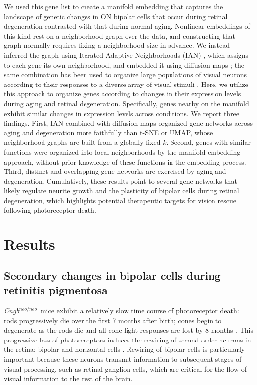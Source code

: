 \documentclass[11pt, a4paper]{article}
\newcommand{\cngb}{\textit{Cngb$^{neo/neo}$}~}
\begin{document}
 We used this gene list to create a manifold embedding that captures the landscape of genetic changes in ON bipolar cells that occur during retinal degeneration contrasted with that during normal aging. Nonlinear embeddings of this kind rest on a neighborhood graph over the data, and constructing that graph normally requires fixing a neighborhood size in advance. We instead inferred the graph using
Iterated Adaptive Neighborhoods (IAN) \citep{Dyballa2023-ur}, which assigns to each gene its own neighborhood, and embedded it using diffusion maps \citep{Coifman2005-te}; the same combination has been used to organize large populations of visual neurons according to their responses to a diverse array of visual stimuli \citep{Dyballa2024-sa}. Here, we utilize this approach to organize genes according to changes in their expression levels during aging and retinal degeneration. Specifically, genes nearby on the manifold exhibit similar changes in expression levels across conditions. We report three findings. First, IAN combined with diffusion maps organized gene networks across aging and degeneration more faithfully than t-SNE or UMAP, whose neighborhood graphs are built from a globally fixed $k$. Second, genes with similar functions were organized into local neighborhoods by the manifold embedding approach, without prior knowledge of these functions in the embedding process. Third, distinct and overlapping gene networks are exercised by aging and degeneration. Cumulatively, these results point to several gene networks that likely regulate neurite growth and the plasticity of bipolar cells during retinal degeneration, which highlights potential therapeutic targets for vision rescue following photoreceptor death.  

\section*{Results}

\subsection*{Secondary changes in bipolar cells during retinitis pigmentosa}
\cngb mice exhibit a relatively slow time course of photoreceptor death: rods progressively die over the first 7 months after birth; cones begin to degenerate as the rods die and all cone light responses are lost by 8 months \citep{Wang2019-pr,Scalabrino2022-um,Scalabrino2023-dk}. This progressive loss of photoreceptors induces the rewiring of second-order neurons in the retina: bipolar and horizontal cells \citep{Bonezzi2025-xo, zhang2024temporal, Jones2003-ae}. Rewiring of bipolar cells is particularly important because these neurons transmit information to subsequent stages of visual processing, such as retinal ganglion cells, which are critical for the flow of visual information to the rest of the brain. 
\end{document}
